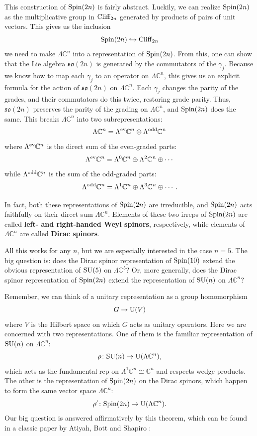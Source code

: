 \documentclass[12pt]{article}
\newcommand{\maps}{\colon}    %
\newcommand{\C}{{\mathbb C}}  %
\newcommand{\U}{{\rm U}}    %
\newcommand{\SU}{{\rm SU}}    %
\newcommand{\Spin}{{\rm Spin}}    %
\newcommand{\so}{{\mathfrak{so}}}  %
\newcommand{\Ex}{\Lambda} %
\newcommand{\Exev}{\Lambda^{\rm ev}} %
\newcommand{\Exodd}{\Lambda^{\rm odd}} %
\newcommand{\Cliff}{{\rm Cliff}}    %
\newcommand{\inclusion}{\hookrightarrow}
\newcommand{\iso}{\cong} %
\newcommand{\define}[1]{{\bf #1}}
\begin{document}
This construction of $\Spin(2n)$ is fairly abstract.  Luckily, we can realize
$\Spin(2n)$ as the multiplicative group in $\Cliff_{2n}$ generated by products
of pairs of unit vectors.  This gives us the inclusion
\[ \Spin(2n) \inclusion \Cliff_{2n} \]
we need to make $\Ex \C^n$ into a representation of $\Spin(2n)$. 
From this, one can show that the Lie algebra $\so(2n)$ is 
generated by the commutators of the $\gamma_j$.  Because we know
how to map each $\gamma_j$ to an operator on $\Ex \C^n$, 
this gives us an explicit formula for the action of $\so(2n)$ on $\Ex \C^n$. 
Each $\gamma_j$
changes the parity of the grades, and their commutators do this twice,
restoring grade parity.  Thus, $\so(2n)$ preserves the parity of the grading on
$\Ex \C^n$, and $\Spin(2n)$ does the same.  This breaks $\Ex \C^n$ into
two subrepresentations:
\[	\Ex \C^n = \Exev \C^n  \oplus \Exodd \C^n	\]
where $\Exev \C^n$ is the direct sum of the even-graded parts:
\[	\Exev \C^n = \Ex^0 \C^n \oplus \Ex^2 \C^n \oplus \cdots	\]
while $\Exodd \C^n$ is the sum of the odd-graded parts:
\[	\Exodd \C^n = \Ex^1 \C^n \oplus \Ex^3 \C^n \oplus \cdots. \]

In fact, both these representations of $\Spin(2n)$ are irreducible, and
$\Spin(2n)$ acts faithfully on their direct sum $\Ex \C^n$. Elements of these
two irreps of $\Spin(2n)$ are called \define{left- and right-handed 
Weyl spinors}, respectively, while elements of $\Ex \C^n$ are called 
\define{Dirac spinors}.

All this works for any $n$, but we are especially interested in the 
case $n=5$.  The big question is: does the Dirac spinor representation of 
$\Spin(10)$ extend the obvious representation of $\SU(5)$ on $\Ex \C^5$?
Or, more generally, does the Dirac spinor representation of $\Spin(2n)$ 
extend the representation of $\SU(n)$ on $\Ex \C^n$?

Remember, we can think of a unitary representation as a group homomorphism
\[ G \to \U(V) \]
where $V$ is the Hilbert space on which $G$ acts as unitary operators.
Here we are concerned with two representations. One of them is the familiar
representation of $\SU(n)$ on $\Ex \C^n$:
\[ \rho \maps \SU(n) \to \U(\Ex \C^n), \]
which acts as the fundamental rep 
on $\Ex^1 \C^n \iso \C^n$ and respects wedge
products. The other is the representation of $\Spin(2n)$ on
the Dirac spinors, which happen to form the same vector space $\Ex \C^n$:
\[ \rho' \maps \Spin(2n) \to \U(\Ex \C^n). \]
Our big question is answered affirmatively by this theorem, which
can be found in a classic paper by Atiyah, Bott and Shapiro
\cite{ABS}:
\end{document}

